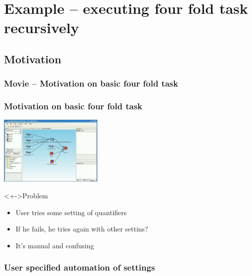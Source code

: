 \documentclass{beamer}
\begin{document}
\section{Example -- executing four fold task recursively}
\subsection{Motivation}
\begin{frame}
	\frametitle{Movie -- Motivation on basic four fold task}
\end{frame}

\begin{frame}
	\frametitle{Motivation on basic four fold task}
	\includegraphics[width=5cm]{exampleMotivation1}
	\begin{block}<+->{Problem}
		\begin{itemize}[<+->]
			\item User tries some setting of quantifiers
			\item If he fails, he tries again with other settins?
			\item It's manual and confusing
		\end{itemize}	
	\end{block}
\end{frame}

\begin{frame}
	\frametitle{User specified automation of settings}
\end{frame}
\end{document}
